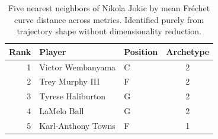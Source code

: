 \begin{table}[htbp]
  \centering\small
  \begin{tabular}{rllc}
    \toprule
    Rank & Player & Position & Archetype \\
    \midrule
    1 & Victor Wembanyama & C & 2 \\
    2 & Trey Murphy III & F & 2 \\
    3 & Tyrese Haliburton & G & 2 \\
    4 & LaMelo Ball & G & 2 \\
    5 & Karl-Anthony Towns & F & 1 \\
    \bottomrule
  \end{tabular}
  \caption{Five nearest neighbors of Nikola Jokic by mean Fr\'{e}chet curve distance across metrics. Identified purely from trajectory shape without dimensionality reduction.}
  \label{tab:Nikola_Jokic_frechet_curve_neighbors}
\end{table}

